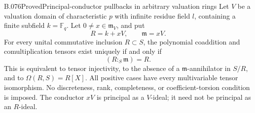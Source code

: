 \begin{saresult}{B.076}{Proved}{Principal-conductor pullbacks in arbitrary valuation rings}
Let $V$ be a valuation domain of characteristic $p$ with infinite residue
field $l$, containing a finite subfield $k=\mathbb F_q$. Let
$0\ne x\in\mathfrak m_V$, and put
\[
                 R=k+xV,\qquad\mathfrak m=xV.
\]
For every unital commutative inclusion $R\subset S$, the polynomial
coaddition and comultiplication tensors exist uniquely if and only if
\[
                           (R:_S\mathfrak m)=R.           \tag{B76.1}
\]
This is equivalent to tensor injectivity, to the absence of a
$\mathfrak m$-annihilator in $S/R$, and to $\Omega(R,S)=R[X]$.
All positive cases have every multivariable tensor isomorphism.
No discreteness, rank, completeness, or coefficient-torsion condition
is imposed. The conductor $xV$ is principal as a $V$-ideal; it need
not be principal as an $R$-ideal.
\end{saresult}
